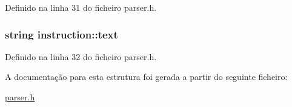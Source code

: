 Definido na linha 31 do ficheiro parser.\-h.

\hypertarget{structinstruction_af31af10ecfe7d2fdf154616d0aede8ea}{
\subsubsection[{text}]{\setlength{\rightskip}{0pt plus 5cm}string instruction\-::text}}\label{structinstruction_af31af10ecfe7d2fdf154616d0aede8ea}


Definido na linha 32 do ficheiro parser.\-h.



A documentação para esta estrutura foi gerada a partir do seguinte ficheiro\-:\begin{DoxyCompactItemize}
\item 
\hyperlink{parser_8h}{parser.\-h}\end{DoxyCompactItemize}
